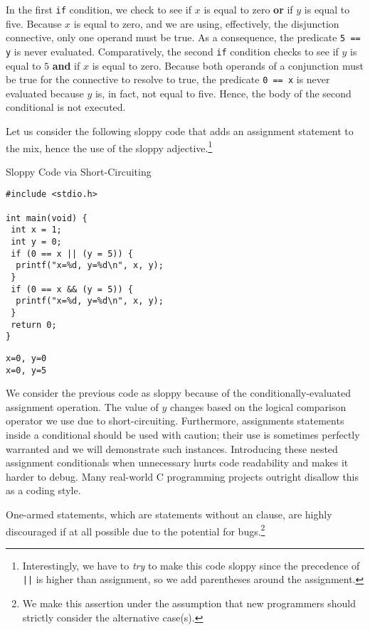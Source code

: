 In the first \texttt{if} condition, we check to see if $x$ is equal to zero \textbf{or} if $y$ is equal to five. Because $x$ is equal to zero, and we are using, effectively, the disjunction connective, only one operand must be true. As a consequence, the predicate \texttt{5 == y} is never evaluated. Comparatively, the second \texttt{if} condition checks to see if $y$ is equal to $5$ \textbf{and} if $x$ is equal to zero. Because both operands of a conjunction must be true for the connective to resolve to true, the predicate \texttt{0 == x} is never evaluated because $y$ is, in fact, not equal to five. Hence, the body of the second conditional is not executed.

Let us consider the following sloppy code that adds an assignment statement to the mix, hence the use of the sloppy adjective.\footnote{Interestingly, we have to \textit{try} to make this code sloppy since the precedence of \texttt{||} is higher than assignment, so we add parentheses around the assignment.}

\begin{cloast}[main.c]{Sloppy Code via Short-Circuiting}
\begin{lstlisting}[language=MyC]
#include <stdio.h>

int main(void) {
 int x = 1;
 int y = 0;
 if (0 == x || (y = 5)) {
  printf("x=%d, y=%d\n", x, y); 
 }
 if (0 == x && (y = 5)) {
  printf("x=%d, y=%d\n", x, y); 
 }
 return 0;
}
\end{lstlisting}
\tcblower
\begin{lstlisting}[language=MyOutput]
x=0, y=0
x=0, y=5
\end{lstlisting}
\end{cloast}

We consider the previous code as sloppy because of the conditionally-evaluated assignment operation. The value of $y$ changes based on the logical comparison operator we use due to short-circuiting. Furthermore, assignments statements inside a conditional should be used with caution; their use is sometimes perfectly warranted and we will demonstrate such instances. Introducing these nested assignment conditionals when unnecessary hurts code readability and makes it harder to debug. Many real-world C programming projects outright disallow this as a coding style.

One-armed  statements, which are  statements without an  clause, are highly discouraged if at all possible due to the potential for bugs.\footnote{We make this assertion under the assumption that new programmers should strictly consider the alternative case(s).}

